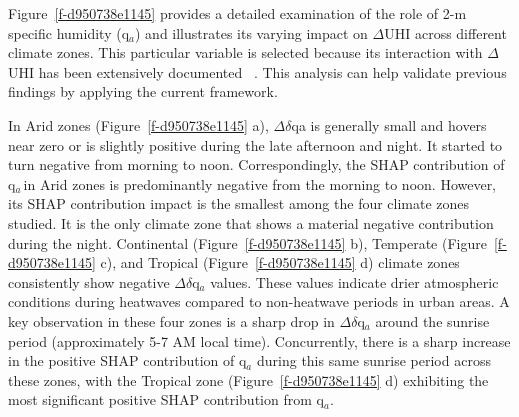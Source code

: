 \documentclass[]{nature}
\makeatletter
\renewenvironment{figure}
               {\@float{figure}}
               {\end@float}
\renewenvironment{figure*}
               {\@dblfloat{figure}}
               {\end@dblfloat}
\def\fixFloatSize#1{}%
\def\fixFloatSize#1{}
\makeatother
\begin{document}
\bgroup
\fixFloatSize{images/0dc5196d-0412-4027-8605-13b8c87bef3b-ufigure_7_feature_group_contribution_by_kg_combined.png}
\begin{figure*}[!htbp]
\centering \makeatletter{}
\makeatother 
\caption{{\textbf{Percentage Contribution of Feature Groups to Predicted \ensuremath{\Delta }UHI, Stratified by K{\"{o}}ppen-Geiger Climate Zones.} Bar chart illustrating the percentage contribution of each feature group to the predicted \ensuremath{\Delta }UHI difference, categorized by K{\"{o}}ppen-Geiger climate zones (Arid, Continental, Temperate, and Tropical). Percentage contributions are derived from aggregated SHAP values, indicating the relative importance of each feature group in driving \ensuremath{\Delta }UHI within each climate region.}}
\label{f-46952309aae5}
\end{figure*}
\egroup
Figure~\ref{f-d950738e1145}   provides a detailed examination of the role of 2-m specific humidity (q\ensuremath{_{a}}) and illustrates its varying impact on \ensuremath{\Delta }UHI across different climate zones. This particular variable is selected because its interaction with \ensuremath{\Delta }UHI has been extensively documented\unskip~\cite{2755510:33598930,2755510:33598952,2755510:33598945,2755510:33598947} . This analysis can help validate previous findings by applying the current framework. 

In Arid zones (Figure~\ref{f-d950738e1145} a), \ensuremath{\Delta }\ensuremath{\delta }qa is generally small and hovers near zero or is slightly positive during the late afternoon and night. It started to turn negative from morning to noon. Correspondingly, the SHAP contribution of q\ensuremath{_{a\ }}in Arid zones is predominantly negative from the morning to noon. However, its SHAP contribution impact is the smallest among the four climate zones studied. It is the only climate zone that shows a material negative contribution during the night. Continental (Figure~\ref{f-d950738e1145} b), Temperate (Figure~\ref{f-d950738e1145} c), and Tropical (Figure~\ref{f-d950738e1145} d) climate zones consistently show negative \ensuremath{\Delta }\ensuremath{\delta }q\ensuremath{_{a}} values. These values indicate drier atmospheric conditions during heatwaves compared to non-heatwave periods in urban areas. A key observation in these four zones is a sharp drop in \ensuremath{\Delta }\ensuremath{\delta }q\ensuremath{_{a}} around the sunrise period (approximately 5-7 AM local time). Concurrently, there is a sharp increase in the positive SHAP contribution of q\ensuremath{_{a}} during this same sunrise period across these zones, with the Tropical zone (Figure~\ref{f-d950738e1145} d) exhibiting the most significant positive SHAP contribution from q\ensuremath{_{a}}.
\end{document}
